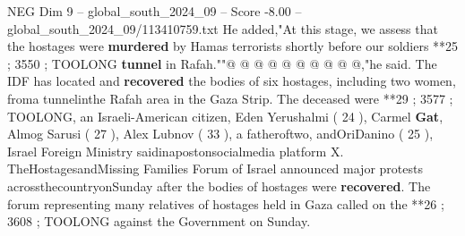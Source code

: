\begin{textsample}{NEG Dim 9 – global\_south\_2024\_09 – Score -8.00 – global\_south\_2024\_09/113410759.txt}
He added,"At this stage, we assess that the hostages were \textbf{murdered} by Hamas terrorists shortly before our soldiers **25 ; 3550 ; TOOLONG \textbf{tunnel} in Rafah.""@ @ @ @ @ @ @ @ @ @,"he said.
The IDF has located and \textbf{recovered} the bodies of six hostages, including two women, froma tunnelinthe Rafah area in the Gaza Strip.
The deceased were **29 ; 3577 ; TOOLONG, an Israeli-American citizen, Eden Yerushalmi ( 24 ), Carmel \textbf{Gat}, Almog Sarusi ( 27 ), Alex Lubnov ( 33 ), a fatheroftwo, andOriDanino ( 25 ), Israel Foreign Ministry saidinapostonsocialmedia platform X.
TheHostagesandMissing Families Forum of Israel announced major protests acrossthecountryonSunday after the bodies of hostages were \textbf{recovered}.
The forum representing many relatives of hostages held in Gaza called on the **26 ; 3608 ; TOOLONG against the Government on Sunday.

\end{textsample}
